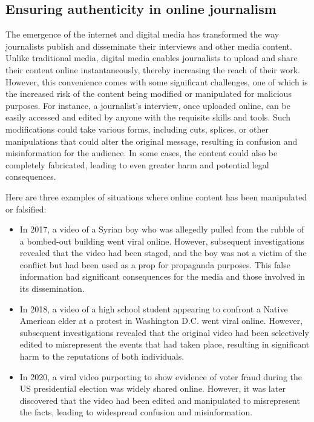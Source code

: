 \documentclass[target=mst,aauheader=]{thud}
\begin{document}
\subsection{Ensuring authenticity in online journalism}
The emergence of the internet and digital media has transformed the way journalists publish and disseminate their interviews and other media content. Unlike traditional media, digital media enables journalists to upload and share their content online instantaneously, thereby increasing the reach of their work. However, this convenience comes with some significant challenges, one of which is the increased risk of the content being modified or manipulated for malicious purposes. For instance, a journalist's interview, once uploaded online, can be easily accessed and edited by anyone with the requisite skills and tools. Such modifications could take various forms, including cuts, splices, or other manipulations that could alter the original message, resulting in confusion and misinformation for the audience. In some cases, the content could also be completely fabricated, leading to even greater harm and potential legal consequences.\par
Here are three examples of situations where online content has been manipulated or falsified:

\begin{itemize}

    \item In 2017, a video of a Syrian boy who was allegedly pulled from the rubble of a bombed-out building went viral online\cite{2017FakeVideo}. However, subsequent investigations revealed that the video had been staged, and the boy was not a victim of the conflict but had been used as a prop for propaganda purposes. This false information had significant consequences for the media and those involved in its dissemination.
    \item In 2018, a video of a high school student appearing to confront a Native American elder at a protest in Washington D.C. went viral online\cite{2018fakeVideo}. However, subsequent investigations revealed that the original video had been selectively edited to misrepresent the events that had taken place, resulting in significant harm to the reputations of both individuals.
    \item In 2020, a viral video purporting to show evidence of voter fraud during the US presidential election was widely shared online\cite{2020fakeVideo}. However, it was later discovered that the video had been edited and manipulated to misrepresent the facts, leading to widespread confusion and misinformation.

\end{itemize}
\end{document}

